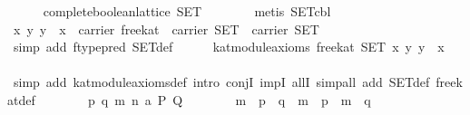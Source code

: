 \begin{isabellebody}
\isanewline
\ \ \ \ \isamarkupfalse%
\ {}complete{}boolean{}lattice\ SET{}\isanewline
\ \ \ \ \ \ \isamarkupfalse%
\ {}metis\ SET{}cbl{}\isanewline
\isanewline
\ \ \ \ \isamarkupfalse%
\ {}{}{}x\ y{}\ y\ {}\ x{}\ {}\ carrier\ free{}kat\ {}\ carrier\ SET\ {}\ carrier\ SET{}\isanewline
\ \ \ \ \ \ \isamarkupfalse%
\ {}simp\ add{}\ ftype{}pred\ SET{}def{}\isanewline
\isanewline
\ \ \ \ \isamarkupfalse%
\ {}kat{}module{}axioms\ free{}kat\ SET\ {}{}x\ y{}\ y\ {}\ x{}{}\isanewline
\ \ \ \ \isamarkupfalse%
\ {}simp\ add{}\ kat{}module{}axioms{}def{}\ intro\ conjI\ impI\ allI{}\ simp{}all\ add{}\ SET{}def\ free{}kat{}def{}\isanewline
\ \ \ \ \ \ \isamarkupfalse%
\ p\ q\ m\ n\ a\ P\ Q\isanewline
\ \ \ \ \ \ \isamarkupfalse%
\ {}m\ {}\ {}p\ {}\ q{}\ {}\ m\ {}\ p\ {}\ m\ {}\ q{}\isanewline

\end{isabellebody}
